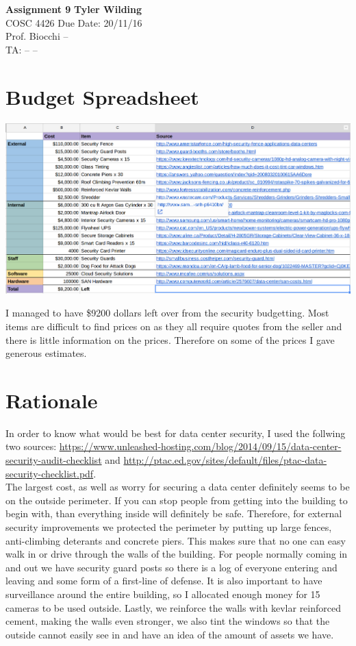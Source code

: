 \documentclass[a4paper, 11pt]{article}
\begin{document}
\noindent
\large\textbf{Assignment 9} \hfill \textbf{Tyler Wilding} \\
\normalsize COSC 4426 \hfill Due Date: 20/11/16 \\
Prof. Biocchi \hfill -- \\
TA: -- \hfill --

\section*{Budget Spreadsheet}
\includegraphics[scale=0.24]{budget.png}

I managed to have \$9200 dollars left over from the security budgetting.  Most items are difficult to find prices on as they all require quotes from the seller and there is little information on the prices.  Therefore on some of the prices I gave generous estimates.


\section*{Rationale}
In order to know what would be best for data center security, I used the follwing two sources: \href{https://www.unleashed-hosting.com/blog/2014/09/15/data-center-security-audit-checklist}{https://www.unleashed-hosting.com/blog/2014/09/15/data-center-security-audit-checklist} and \href{http://ptac.ed.gov/sites/default/files/ptac-data-security-checklist.pdf}{http://ptac.ed.gov/sites/default/files/ptac-data-security-checklist.pdf}.\\

The largest cost, as well as worry for securing a data center definitely seems to be on the outside perimeter.  If you can stop people from getting into the building to begin with, than everything inside will definitely be safe.  Therefore, for external security improvements we protected the perimeter by putting up large fences, anti-climbing deterants and concrete piers.  This makes sure that no one can easy walk in or drive through the walls of the building.  For people normally coming in and out we have security guard posts so there is a log of everyone entering and leaving and some form of a first-line of defense.  It is also important to have surveillance around the entire building, so I allocated enough money for 15 cameras to be used outside.  Lastly, we reinforce the walls with kevlar reinforced cement, making the walls even stronger, we also tint the windows so that the outside cannot easily see in and have an idea of the amount of assets we have.\\
\end{document}
